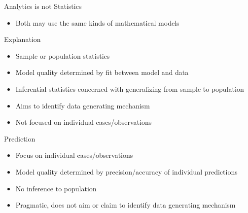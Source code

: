 \documentclass[ignorenonframetext,xcolor=dvipsnames]{beamer}
\begin{document}
\begin{frame}{Analytics is not Statistics}
\footnotesize
\begin{itemize}
	\item Both may use the same kinds of mathematical models
\end{itemize}
\begin{block}{Explanation}
\begin{itemize}
	\item Sample or population statistics
	\item Model quality determined by fit between model and data
	\item Inferential statistics concerned with generalizing from sample to population
	\item Aims to identify data generating mechanism
	\item Not focused on individual cases/observations
\end{itemize}
\end{block}
\begin{block}{Prediction}
\begin{itemize}
	\item Focus on individual cases/observations
	\item Model quality determined by precision/accuracy of individual predictions
	\item No inference to population
	\item Pragmatic, does not aim or claim to identify data generating mechanism
\end{itemize}
\end{block}
\end{frame}
\end{document}
